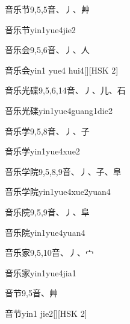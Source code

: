 \begin{Entry}{音乐节}{9,5,5}{⾳、⼃、⾋}
  \begin{Phonetics}{音乐节}{yin1yue4jie2}
  \end{Phonetics}
\end{Entry}

\begin{Entry}{音乐会}{9,5,6}{⾳、⼃、⼈}
  \begin{Phonetics}{音乐会}{yin1 yue4 hui4}[][HSK 2]
  \end{Phonetics}
\end{Entry}

\begin{Entry}{音乐光碟}{9,5,6,14}{⾳、⼃、⼉、⽯}
  \begin{Phonetics}{音乐光碟}{yin1yue4guang1die2}
  \end{Phonetics}
\end{Entry}

\begin{Entry}{音乐学}{9,5,8}{⾳、⼃、⼦}
  \begin{Phonetics}{音乐学}{yin1yue4xue2}
  \end{Phonetics}
\end{Entry}

\begin{Entry}{音乐学院}{9,5,8,9}{⾳、⼃、⼦、⾩}
  \begin{Phonetics}{音乐学院}{yin1yue4xue2yuan4}
  \end{Phonetics}
\end{Entry}

\begin{Entry}{音乐院}{9,5,9}{⾳、⼃、⾩}
  \begin{Phonetics}{音乐院}{yin1yue4yuan4}
  \end{Phonetics}
\end{Entry}

\begin{Entry}{音乐家}{9,5,10}{⾳、⼃、⼧}
  \begin{Phonetics}{音乐家}{yin1yue4jia1}
  \end{Phonetics}
\end{Entry}

\begin{Entry}{音节}{9,5}{⾳、⾋}
  \begin{Phonetics}{音节}{yin1 jie2}[][HSK 2]
  \end{Phonetics}
\end{Entry}

